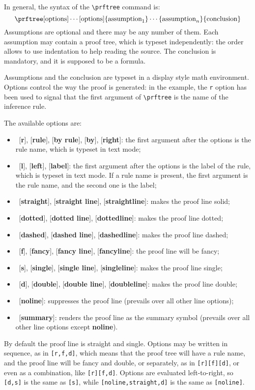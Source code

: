 \documentclass{amsart}
\begin{document}
In general, the syntax of the \verb|\prftree| command is:
\begin{displaymath}
  \verb|\prftree|[\mbox{options}] \cdots
  [\mbox{options}]\{\mbox{assumption}_1\} \cdots
  \{\mbox{assumption}_n\}\{\mbox{conclusion}\}
\end{displaymath}
Assumptions are optional and there may be any number of them. Each
assumption may contain a proof tree, which is typeset independently:
the order allows to use indentation to help reading the source. The
conclusion is mandatory, and it is supposed to be a
formula. 

Assumptions and the conclusion are typeset in a display style math
environment. Options control the way the proof is generated: in the
example, the \verb|r| option has been used to signal that the first
argument of \verb|\prftree| is the name of the inference rule.  

The available options are:
\begin{itemize}
\item\ [\textbf{r}], [\textbf{rule}], [\textbf{by rule}],
  [\textbf{by}], [\textbf{right}]: the first argument after the
  options is the rule name, which is typeset in text mode;
\item\ [\textbf{l}], [\textbf{left}], [\textbf{label}]: the first
  argument after the options is the label of the rule, which is
  typeset in text mode. If a rule name is present, the first argument
  is the rule name, and the second one is the label;
\item\ [\textbf{straight}], [\textbf{straight line}],
  [\textbf{straightline}]: makes the proof line solid;
\item\ [\textbf{dotted}], [\textbf{dotted line}],
  [\textbf{dottedline}]: makes the proof line  dotted;
\item\ [\textbf{dashed}], [\textbf{dashed line}],
  [\textbf{dashedline}]: makes the proof line dashed;
\item\ [\textbf{f}], [\textbf{fancy}], [\textbf{fancy line}],
  [\textbf{fancyline}]: the proof line will be fancy;
\item\ [\textbf{s}], [\textbf{single}], [\textbf{single line}],
  [\textbf{singleline}]: makes the proof line single;
\item\ [\textbf{d}], [\textbf{double}], [\textbf{double line}],
  [\textbf{doubleline}]: makes the proof line double;
\item\ [\textbf{noline}]: suppresses the proof line (prevails over all
  other line options);
\item\ [\textbf{summary}]: renders the proof line as the summary
  symbol (prevails over all other line options except \textbf{noline}).
\end{itemize}
By default the proof line is straight and single.  Options may be
written in sequence, as in \verb|[r,f,d]|, which means that the proof
tree will have a rule name, and the proof line will be fancy and
double, or separately, as in \verb|[r][f][d]|, or even as a
combination, like \verb|[r][f,d]|. Options are evaluated
left-to-right, so \verb|[d,s]| is the same as \verb|[s]|, while
\verb|[noline,straight,d]| is the same as \verb|[noline]|.
\end{document}

